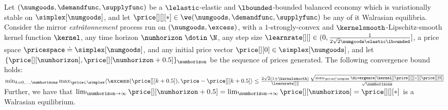 \begin{theorem}\label{thm:mirror_extratatonn_var_stable}
    Let $(\numgoods, \demandfunc, \supplyfunc)$ be a $\lelastic$-elastic and $\lbounded$-bounded balanced economy which is variationally stable on $\simplex[\numgoods]$, and let $\price[][][*] \in \we(\numgoods, \demandfunc, \supplyfunc)$ be any of it Walrasian equilibria.
    Consider the mirror \emph{extr\^atonnement} process run on $(\numgoods, \excess)$, with a $1$-strongly-convex and $\kernelsmooth$-Lipschitz-smooth kernel function $\kernel$, any time horizon $\numhorizon \ \dotin \  \N$, any step size $\learnrate[ ][ ] \in (0, \frac{1}{2\sqrt{2}\numgoods \elastic \lbounded}]$, a price space $\pricespace \doteq \simplex[\numgoods]$, and any initial price vector $\price[][0] \in \simplex[\numgoods]$, and let $\{\price[][\numhorizon], \price[][\numhorizon + 0.5] \}_{\numhorizon}$ be the sequence of prices generated. The following convergence bound holds: 
$
        \min_{k = 0, \hdots, \numhorizons} \max_{\price \in \simplex} \langle \excess(\price[][k+0.5]),  \price - \price[][k+0.5] \rangle \leq  \frac{2 \sqrt{2}(1 + \kernelsmooth)}{\learnrate[ ][ ]} \frac{\sqrt{\max_{\price \in \simplex}\divergence[\kernel][{\price[][][*]}][{\price[][0]}]}}{\sqrt{\numhorizons}}
$
    Further, we have that $\lim_{\numhorizon \to \infty} \price[][\numhorizon+0.5] = \lim_{\numhorizon \to \infty} \price[][\numhorizon] = \price[][][*]$ is a Walrasian equilibrium.
\end{theorem}
\fi 

